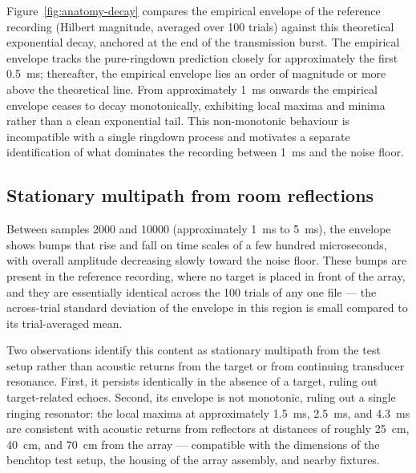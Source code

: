 Figure~\ref{fig:anatomy-decay}
compares the empirical envelope of the reference recording (Hilbert
magnitude, averaged over 100 trials) against this theoretical
exponential decay, anchored at the end of the transmission burst.
The empirical envelope tracks the pure-ringdown prediction closely
for approximately the first \SI{0.5}{\milli\second}; thereafter, the
empirical envelope lies an order of magnitude or more above the
theoretical line. From approximately \SI{1}{\milli\second} onwards
the empirical envelope ceases to decay monotonically, exhibiting
local maxima and minima rather than a clean exponential tail. This
non-monotonic behaviour is incompatible with a single ringdown
process and motivates a separate identification of what dominates
the recording between \SI{1}{\milli\second} and the noise floor.

\subsection{Stationary multipath from room reflections}
\label{sec:multipath}

Between samples 2000 and 10000 (approximately
\SI{1}{\milli\second} to \SI{5}{\milli\second}), the envelope shows
bumps that rise and fall on time scales of a few hundred
microseconds, with overall amplitude decreasing slowly toward the
noise floor. These bumps are present in the reference recording,
where no target is placed in front of the array, and they are
essentially identical across the 100 trials of any one file --- the
across-trial standard deviation of the envelope in this region is
small compared to its trial-averaged mean.

Two observations identify this content as stationary multipath
from the test setup rather than acoustic returns from the target
or from continuing transducer resonance. First, it persists
identically in the absence of a target, ruling out target-related
echoes. Second, its envelope is not monotonic, ruling out a single
ringing resonator: the local maxima at approximately
\SI{1.5}{\milli\second}, \SI{2.5}{\milli\second}, and
\SI{4.3}{\milli\second} are consistent with acoustic returns from
reflectors at distances of roughly \SI{25}{cm}, \SI{40}{cm}, and
\SI{70}{cm} from the array --- compatible with the dimensions of
the benchtop test setup, the housing of the array assembly, and
nearby fixtures.

